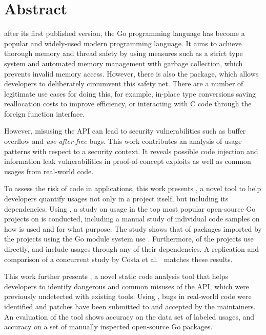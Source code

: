 \chapter*{Abstract}

 after its first published version, the Go programming language has become a popular and
widely-used modern programming language.
It aims to achieve thorough memory and thread safety by using measures such as a strict type system and automated memory
management with garbage collection, which prevents invalid memory access.
However, there is also the \unsafe{} package, which allows developers to deliberately circumvent this safety net.
There are a number of legitimate use cases for doing this, for example, in-place type conversions saving reallocation
costs to improve efficiency, or interacting with C code through the foreign function interface.

However, misusing the \unsafe{} API can lead to security vulnerabilities such as buffer overflow and
\textit{use-after-free} bugs.
This work contributes an analysis of \unsafe{} usage patterns with respect to a security context.
It reveals possible code injection and information leak vulnerabilities in proof-of-concept exploits as well as common
usages from real-world code.

To assess the risk of \unsafe{} code in applications, this work presents \toolGeiger{}, a novel tool to help developers
quantify \unsafe{} usages not only in a project itself, but including its dependencies.
Using \toolGeiger{}, a study on \unsafe{} usage in the top \projsTotal{} most popular open-source Go projects on
\github{} is conducted, including a manual study of \numberLabeledCodeSnippets{} individual code samples on how
\unsafe{} is used and for what purpose.
The study shows that \percentageUnsafePackages{} of packages imported by the projects using the Go module system use
\unsafe{}.
Furthermore, \percentageUnsafeProjects{} of the projects use \unsafe{} directly, and
\percentageUnsafeTransitiveWithDependencies{} include \unsafe{} usages through any of their dependencies.
A replication and comparison of a concurrent study by Costa et al.~\cite{costa2020} matches these results.

This work further presents \toolSafer{}, a novel static code analysis tool that helps developers to identify
 dangerous and common misuses of the \unsafe{} API, which were previously undetected with existing tools.
Using \toolSafer{}, \numberBugsFixed{} bugs in real-world code were identified and patches have been submitted to and
accepted by the maintainers.
An evaluation of the tool shows \goSaferEvaluationDatasetGosaferAccuracy{} accuracy on the data set of labeled \unsafe{}
usages, and \goSaferEvaluationPackagesGosaferAccuracy{} accuracy on a set of manually inspected open-source Go packages.


